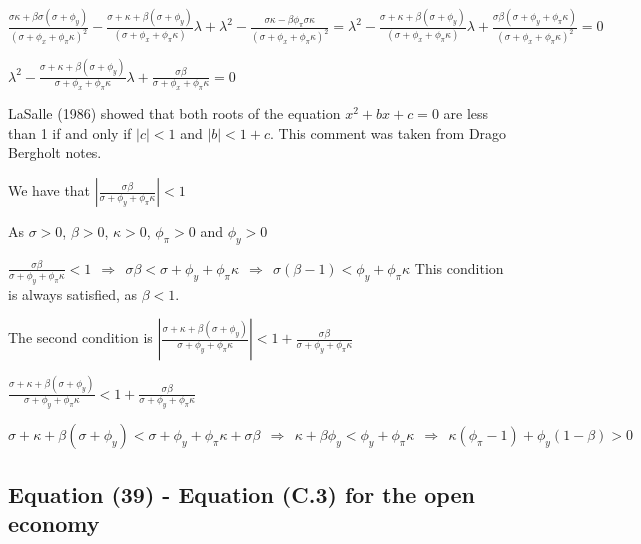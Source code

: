 \documentclass[
]{article}
\begin{document}
\(\displaystyle \frac{\sigma \kappa + \beta\sigma (\sigma+\phi_y)}{(\sigma+\phi_x + \phi_\pi \kappa)^2}- \frac{\sigma +\kappa + \beta (\sigma+ \phi_y)}{(\sigma+\phi_x + \phi_\pi \kappa)} \lambda + \lambda^2-\frac{\sigma \kappa-\beta \phi_\pi \sigma \kappa}{(\sigma+\phi_x + \phi_\pi \kappa)^2}=\lambda^2- \frac{\sigma +\kappa + \beta (\sigma+ \phi_y)}{(\sigma+\phi_x + \phi_\pi \kappa)} \lambda + \frac{\sigma \beta(\sigma+\phi_y+\phi_\pi \kappa)}{(\sigma+\phi_x + \phi_\pi \kappa)^2}=0\)

\(\displaystyle \lambda^2- \frac{\sigma +\kappa + \beta (\sigma+ \phi_y)}{\sigma+\phi_x + \phi_\pi \kappa} \lambda + \frac{\sigma \beta}{\sigma+\phi_x + \phi_\pi \kappa}=0\)

LaSalle (1986) showed that both roots of the equation \(x^2+bx+c=0\) are
less than 1 if and only if \(|c|<1\) and \(|b|<1+c\). This comment was
taken from Drago Bergholt notes.

We have that
\(\displaystyle \left| \frac{\sigma \beta}{\sigma+ \phi_y+\phi_\pi \kappa} \right|<1\)

As \(\sigma>0\), \(\beta>0\), \(\kappa>0\), \(\phi_\pi>0\) and
\(\phi_y>0\)

\(\displaystyle \frac{\sigma \beta}{\sigma+ \phi_y+\phi_\pi \kappa} <1 \ \ \Rightarrow \ \ \sigma \beta<\sigma+ \phi_y+\phi_\pi \kappa \ \ \Rightarrow \ \ \sigma (\beta-1)< \phi_y+\phi_\pi \kappa\)
This condition is always satisfied, as \(\beta<1\).

The second condition is
\(\displaystyle \left| \frac{\sigma+\kappa+ \beta(\sigma+\phi_y)}{\sigma+ \phi_y+\phi_\pi \kappa} \right|<1+\frac{\sigma \beta}{\sigma+ \phi_y+\phi_\pi \kappa}\)

\(\displaystyle \frac{\sigma+\kappa+ \beta(\sigma+\phi_y)}{\sigma+ \phi_y+\phi_\pi \kappa} < 1+\frac{\sigma \beta}{\sigma+ \phi_y+\phi_\pi \kappa}\)

\(\sigma+\kappa+ \beta(\sigma+\phi_y) < \sigma+ \phi_y+\phi_\pi \kappa + \sigma \beta \ \ \Rightarrow \ \ \kappa + \beta \phi_y<\phi_y+\phi_\pi \kappa \ \ \Rightarrow \ \ \kappa (\phi_\pi-1)+\phi_y(1-\beta)>0\)

\vspace{12pt}

\hypertarget{equation-39---equation-c.3-for-the-open-economy}{%
\subsection{Equation (39) - Equation (C.3) for the open
economy}\label{equation-39---equation-c.3-for-the-open-economy}}
\end{document}
